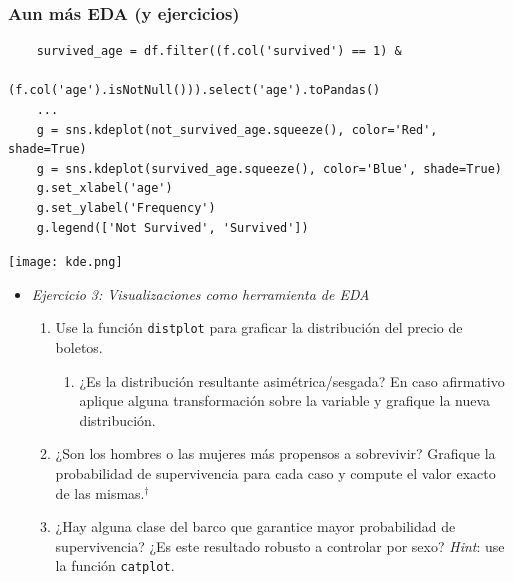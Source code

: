 \documentclass[leqno, 10pt, envcountsect]{beamer}
\numberwithin{equation}{section}
\theoremstyle{definition}
\theoremstyle{example}
\numberwithin{figure}{section}
\numberwithin{table}{section}
\let\olditem\item
\renewcommand{\item}{%
\olditem\vspace{1pt}}
\begin{document}
\begin{frame}[fragile=singleslide]
  \frametitle{Aun más EDA (y ejercicios)}
    \begin{verbatim}
    survived_age = df.filter((f.col('survived') == 1) &
                   (f.col('age').isNotNull())).select('age').toPandas()
    ...
    g = sns.kdeplot(not_survived_age.squeeze(), color='Red', shade=True)
    g = sns.kdeplot(survived_age.squeeze(), color='Blue', shade=True)
    g.set_xlabel('age')
    g.set_ylabel('Frequency')
    g.legend(['Not Survived', 'Survived'])
    \end{verbatim}
    \begin{center}
      \texttt{[image: kde.png]}
    \end{center}
  \begin{itemize}
    \item \textit{Ejercicio 3: Visualizaciones como herramienta de EDA}
      \begin{enumerate}
        \item Use la función \texttt{distplot} para graficar la distribución del
          precio de boletos.
          \begin{enumerate}
            \item ¿Es la distribución resultante asimétrica/sesgada? En caso
              afirmativo aplique alguna transformación sobre la variable y
              grafique la nueva distribución.
          \end{enumerate}
        \item ¿Son los hombres o las mujeres más propensos a sobrevivir?
          Grafique la probabilidad de supervivencia para cada caso y compute el
          valor exacto de las mismas.$^{\dag}$
        \item ¿Hay alguna clase del barco que garantice mayor probabilidad de
          supervivencia? ¿Es este resultado robusto a controlar por sexo?
          \textit{Hint}: use la función \texttt{catplot}.
      \end{enumerate}
  \end{itemize}
\end{frame}
\end{document}
